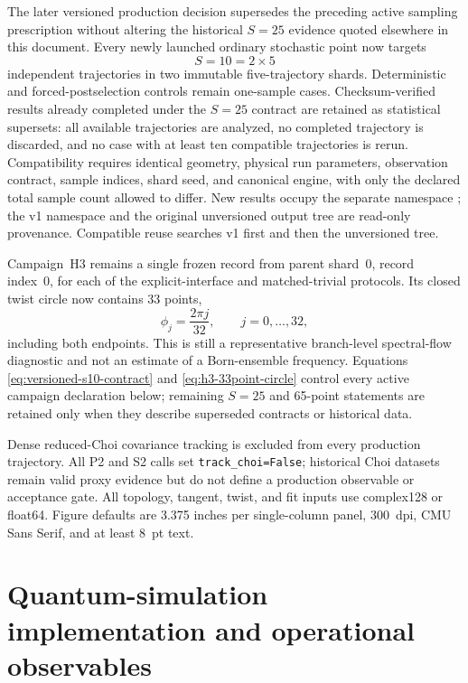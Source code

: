 \documentclass[aps,prx,twocolumn,floatfix,nofootinbib,superscriptaddress,longbibliography]{revtex4-2}
\newcommand{\code}[1]{\texttt{#1}}
\begin{document}
The later versioned production decision supersedes the preceding active sampling
prescription without altering the historical $S=25$ evidence quoted elsewhere in this
document.  Every newly launched ordinary stochastic point now targets
\begin{equation}
 S=10=2\times 5
 \label{eq:versioned-s10-contract}
\end{equation}
independent trajectories in two immutable five-trajectory shards.  Deterministic and
forced-postselection controls remain one-sample cases.  Checksum-verified results already
completed under the $S=25$ contract are retained as statistical supersets: all available
trajectories are analyzed, no completed trajectory is discarded, and no case with at
least ten compatible trajectories is rerun.  Compatibility requires identical geometry,
physical run parameters, observation contract, sample indices, shard seed, and canonical
engine, with only the declared total sample count allowed to differ.  New results occupy
the separate namespace
; the v1 namespace and the
original unversioned output tree are read-only provenance.  Compatible reuse searches v1
first and then the unversioned tree.

Campaign~H3 remains a single frozen record from parent shard~0, record index~0, for each
of the explicit-interface and matched-trivial protocols.  Its closed twist circle now
contains 33 points,
\begin{equation}
 \phi_j=\frac{2\pi j}{32},\qquad j=0,\ldots,32,
 \label{eq:h3-33point-circle}
\end{equation}
including both endpoints.  This is still a representative branch-level spectral-flow
diagnostic and not an estimate of a Born-ensemble frequency.  Equations
\eqref{eq:versioned-s10-contract} and \eqref{eq:h3-33point-circle} control every active
campaign declaration below; remaining $S=25$ and 65-point statements are retained only
when they describe superseded contracts or historical data.

Dense reduced-Choi covariance tracking is excluded from every production trajectory.
All P2 and S2 calls set \code{track\_choi=False}; historical Choi datasets remain valid
proxy evidence but do not define a production observable or acceptance gate.
All topology, tangent, twist, and fit inputs use complex128 or float64.  Figure defaults are
3.375 inches per single-column panel, 300~dpi, CMU Sans Serif, and at least 8~pt text.

\section{Quantum-simulation implementation and operational observables}
\end{document}
